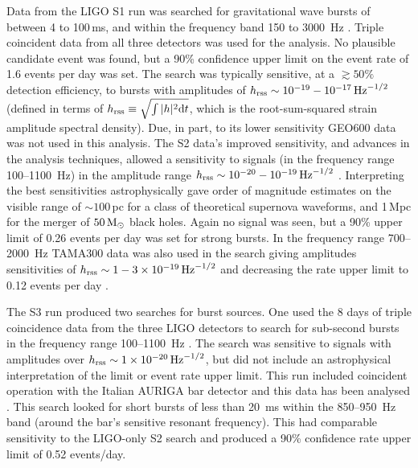 \documentclass{article}
\begin{document}
Data from the LIGO S1 run was searched for gravitational wave bursts of between
4 to 100\,ms, and within the frequency band 150 to 3000~Hz \cite{Abbott:2004b}.
Triple coincident data from all three detectors was used for the analysis. No
plausible candidate event was found, but a 90\% confidence upper limit on the
event rate of 1.6 events per day was set. The search was typically sensitive, at
a $\gtrsim50\%$ detection efficiency, to bursts with amplitudes of $h_{\rm
rss}\sim10^{-19}-10^{-17}\,{\rm Hz}^{-1/2}$ (defined in terms of $h_{\rm
rss} \equiv \sqrt{\int|h|^2{\rm d}t}$, which is the root-sum-squared strain
amplitude spectral density). Due, in part, to its lower sensitivity GEO600 data
was not used in this analysis. The S2 data's improved sensitivity, and advances
in the analysis techniques, allowed a sensitivity to signals (in the frequency
range 100--1100~Hz) in the amplitude range $h_{\rm
rss}\sim10^{-20}-10^{-19}\,{\rm Hz}^{-1/2}$ \cite{Abbott:2005a}. Interpreting
the best sensitivities astrophysically gave order of magnitude estimates on the
visible range of $\sim100$\,pc for a class of theoretical supernova waveforms,
and 1\,Mpc for the merger of $50\,{\rm M}_{\odot}$ black holes. Again no signal
was seen, but a 90\% upper limit of 0.26 events per day was set for strong
bursts. In the frequency range 700--2000~Hz TAMA300 data was also used in the
search giving amplitudes sensitivities of $h_{\rm
rss}\sim1-3\times10^{-19}\,{\rm Hz}^{-1/2}$ and decreasing the rate upper limit
to 0.12 events per day \cite{Abbott:2005c}.

The S3 run produced two searches for burst sources. One used the 8 days of
triple coincidence data from the three LIGO detectors to search for sub-second
bursts in the frequency range 100--1100~Hz \cite{Abbott:2006a}. The search was
sensitive to signals with amplitudes over $h_{\rm rss}\sim1\times10^{-20}\,{\rm
Hz}^{-1/2}$, but did not include an astrophysical interpretation of the limit or
event rate upper limit. This run included coincident operation with the Italian
AURIGA bar detector and this data has been analysed \cite{Baggio:2008}. This
search looked for short bursts of less than 20~ms within the 850--950~Hz band
(around the bar's sensitive resonant frequency). This had comparable sensitivity
to the LIGO-only S2 search and produced a 90\% confidence rate upper limit of
0.52 events/day.
\end{document}
